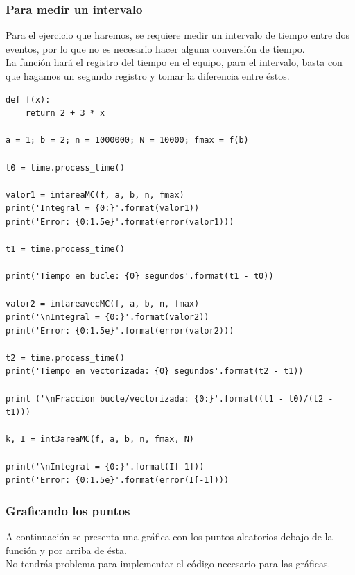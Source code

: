 \documentclass[12pt]{beamer}
\begin{document}
\begin{frame}
\frametitle{Para medir un intervalo}
Para el ejercicio que haremos, se requiere medir un intervalo de tiempo entre dos eventos, por lo que no es necesario hacer alguna conversión de tiempo.
\\
\bigskip
\pause
La función  hará el registro del tiempo en el equipo, para el intervalo, basta con que hagamos un segundo registro y tomar la diferencia entre éstos.
\end{frame}
\begin{frame}
\begin{lstlisting}[caption=Implementación del código]
def f(x):
    return 2 + 3 * x

a = 1; b = 2; n = 1000000; N = 10000; fmax = f(b)

t0 = time.process_time()

valor1 = intareaMC(f, a, b, n, fmax)
print('Integral = {0:}'.format(valor1))
print('Error: {0:1.5e}'.format(error(valor1)))

t1 = time.process_time()

print('Tiempo en bucle: {0} segundos'.format(t1 - t0))

valor2 = intareavecMC(f, a, b, n, fmax)
print('\nIntegral = {0:}'.format(valor2))
print('Error: {0:1.5e}'.format(error(valor2)))

t2 = time.process_time()
print('Tiempo en vectorizada: {0} segundos'.format(t2 - t1))

print ('\nFraccion bucle/vectorizada: {0:}'.format((t1 - t0)/(t2 - t1)))

k, I = int3areaMC(f, a, b, n, fmax, N)

print('\nIntegral = {0:}'.format(I[-1]))
print('Error: {0:1.5e}'.format(error(I[-1])))
\end{lstlisting}
\end{frame}
\begin{frame}
\frametitle{Graficando los puntos}
A continuación se presenta una gráfica con los puntos aleatorios debajo de la función y por arriba de ésta.
\\
\bigskip
\pause
No tendrás problema para implementar el código necesario para las gráficas. \pause {}
\end{frame}
\end{document}
